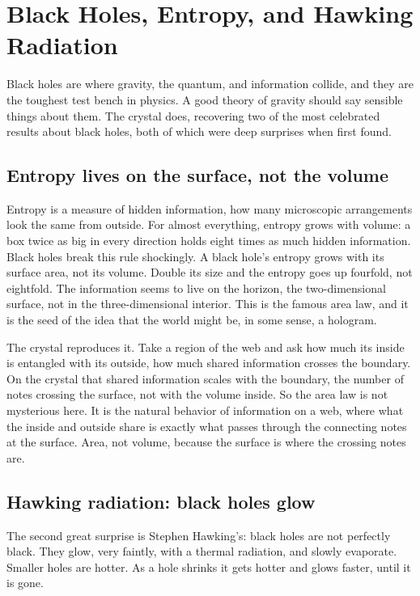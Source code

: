 \section{Black Holes, Entropy, and Hawking Radiation}

Black holes are where gravity, the quantum, and information collide, and they are the toughest test bench in physics. A good theory of gravity should say sensible things about them. The crystal does, recovering two of the most celebrated results about black holes, both of which were deep surprises when first found.

\subsection{Entropy lives on the surface, not the volume}

Entropy is a measure of hidden information, how many microscopic arrangements look the same from outside. For almost everything, entropy grows with volume: a box twice as big in every direction holds eight times as much hidden information. Black holes break this rule shockingly. A black hole's entropy grows with its surface area, not its volume. Double its size and the entropy goes up fourfold, not eightfold. The information seems to live on the horizon, the two-dimensional surface, not in the three-dimensional interior. This is the famous area law, and it is the seed of the idea that the world might be, in some sense, a hologram.

The crystal reproduces it. Take a region of the web and ask how much its inside is entangled with its outside, how much shared information crosses the boundary. On the crystal that shared information scales with the boundary, the number of notes crossing the surface, not with the volume inside. So the area law is not mysterious here. It is the natural behavior of information on a web, where what the inside and outside share is exactly what passes through the connecting notes at the surface. Area, not volume, because the surface is where the crossing notes are.

\subsection{Hawking radiation: black holes glow}

The second great surprise is Stephen Hawking's: black holes are not perfectly black. They glow, very faintly, with a thermal radiation, and slowly evaporate. Smaller holes are hotter. As a hole shrinks it gets hotter and glows faster, until it is gone.

